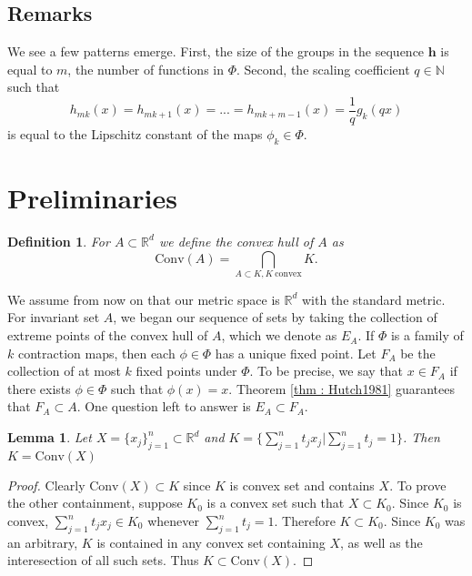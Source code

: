 \documentclass [52pt] {article}
\newcommand{\R}{\mathbb{R}}
\newcommand{\N}{\mathbb{N}}
\newcommand{\conv}{\text{Conv}}
\newtheorem{lemma}{Lemma}
\newtheorem{definition}{Definition}
\begin{document}
\subsection{Remarks}

We see a few patterns emerge.  First, the size of the groups in the sequence $\mathbf{h}$ is equal to $m$, the number of functions in $\Phi$.  Second, the scaling coefficient $q\in\N$ such that
\[h_{mk}(x) = h_{mk+1}(x) = ...= h_{mk+m-1}(x) = \frac{1}{q} g_k(qx)\]
is equal to the Lipschitz constant of the maps $\phi_k\in\Phi$. 

\section{Preliminaries}

\begin{definition}
For $A\subset\R^d$ we define the convex hull of $A$ as
\[\conv(A) = \bigcap_{A\subset K,K\:\text{convex}} K.\]
\end{definition}
We assume from now on that our metric space is $\R^d$ with the standard metric.  For invariant set $A$, we began our sequence of sets by taking the collection of extreme points of the convex hull of $A$, which we denote as $E_A$.  If $\Phi$ is a family of $k$ contraction maps, then each $\phi\in\Phi$ has a unique fixed point.  Let $F_A$ be the collection of at most $k$ fixed points under $\Phi$.  To be precise, we say that $x\in F_A$ if there exists $\phi\in\Phi$ such that $\phi(x) = x$.  Theorem \ref{thm : Hutch1981} guarantees that $F_A \subset A$.  One question left to answer is $E_A\subset F_A$.  

\begin{lemma}
Let $X = \{x_j\}_{j=1}^n\subset \R^d$ and $K = \{\sum_{j=1}^nt_jx_j|\sum_{j=1}^n t_j = 1\}$.  Then $K = \conv(X)$
\end{lemma} 
\begin{proof}
Clearly $\conv(X)\subset K$ since $K$ is convex set and contains $X$.  To prove the other containment, suppose $K_0$ is a convex set such that $X\subset K_0$.  Since $K_0$ is convex, $\sum_{j=1}^nt_jx_j \in K_0$ whenever $\sum_{j = 1}^n t_j = 1$.  Therefore $K\subset K_0$.  Since $K_0$ was an arbitrary, $K$ is contained in any convex set containing $X$, as well as the interesection of all such sets.  Thus $K\subset \conv(X)$.
\end{proof}
\end{document}
